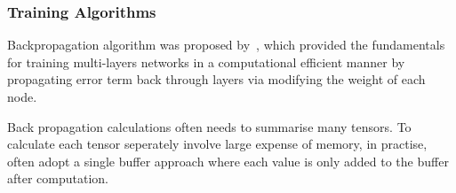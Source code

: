 \subsubsection{Training Algorithms}
Backpropagation algorithm was proposed by~\citet{werbos1975beyond}, which provided the fundamentals for training multi-layers networks in a computational efficient manner by propagating error term back through layers via modifying the weight of each node. 
\par

Back propagation calculations often needs to summarise many tensors. To calculate each tensor seperately involve large expense of memory, in practise, often adopt a single buffer approach where each value is only added to the buffer after computation.